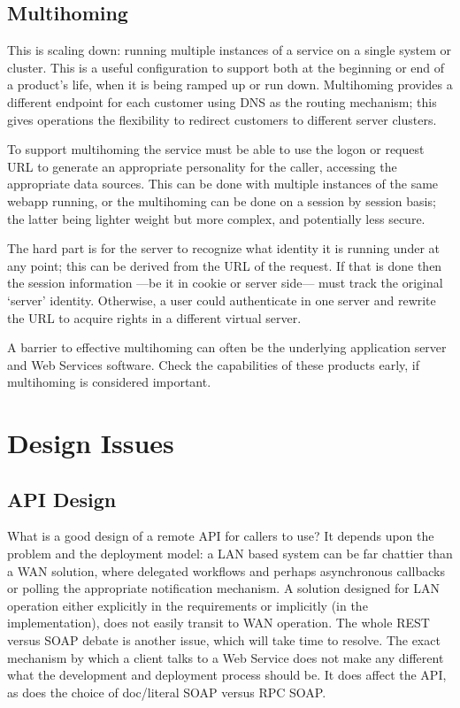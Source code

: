 \documentclass[draft]{report}
\begin{document}
\section{Multihoming}

This is scaling down: running multiple instances of a service on a
single system or cluster. This is a useful configuration to support both
at the beginning or end of a product's life, when it is being ramped up
or run down. Multihoming provides a different endpoint for each customer
using DNS as the routing mechanism; this gives operations the
flexibility to redirect customers to different server clusters.

To support multihoming the service must be able to use the logon or
request URL to generate an appropriate personality for the caller,
accessing the appropriate data sources. This can be done with multiple
instances of the same webapp running, or the multihoming can be done on
a session by session basis; the latter being lighter weight but more
complex, and potentially less secure.

The hard part is for the server to recognize what identity it is running
under at any point; this can be derived from the URL of the request. If
that is done then the session information ---be it in cookie or server
side--- must track the original `server' identity. Otherwise, a user
could authenticate in one server and rewrite the URL to acquire rights
in a different virtual server.

A barrier to effective multihoming can often be the underlying
application server and Web Services software. Check the capabilities of
these products early, if multihoming is considered important.

\chapter{Design Issues}

\section{API Design}

What is a good design of a remote API for callers to use? It depends
upon the problem and the deployment model: a LAN based system can be far
chattier than a WAN solution, where delegated workflows and perhaps
asynchronous callbacks or polling the appropriate notification
mechanism. A solution designed for LAN operation either explicitly in
the requirements or implicitly (in the implementation), does not easily
transit to WAN operation. The whole REST versus SOAP debate is another
issue, which will take time to resolve. The exact mechanism by which a
client talks to a Web Service does not make any different what the
development and deployment process should be. It does affect the API, as
does the choice of doc/literal SOAP versus RPC SOAP.
\end{document}
